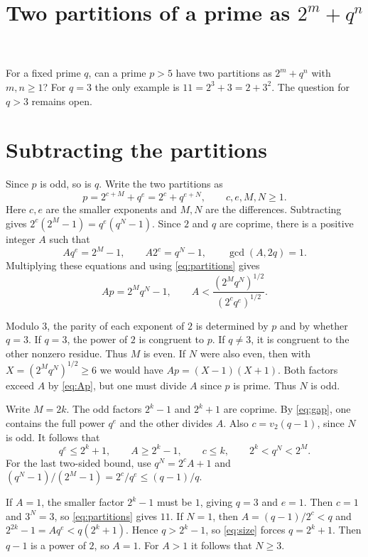 \documentclass[11pt]{article}
\title{Two partitions of a prime as \texorpdfstring{$2^m+q^n$}{2^m + q^n}}
\author{}
\date{}
\begin{document}
\maketitle

For a fixed prime $q$, can a prime $p>5$ have two partitions
as $2^m+q^n$ with $m,n\ge1$? For $q=3$ the only example is
$11=2^3+3=2+3^2$. The question for $q>3$ remains open.

\section{Subtracting the partitions}

Since $p$ is odd, so is $q$. Write the two partitions as
\begin{equation}\label{eq:partitions}
p=2^{c+M}+q^e=2^c+q^{e+N},
\qquad c,e,M,N\ge1.
\end{equation}
Here $c,e$ are the smaller exponents and $M,N$ are the differences.
Subtracting gives $2^c(2^M-1)=q^e(q^N-1)$. Since $2$ and $q$ are coprime,
there is a positive integer $A$ such that
\begin{equation}\label{eq:gap}
Aq^e=2^M-1,\qquad A2^c=q^N-1,\qquad \gcd(A,2q)=1.
\end{equation}
Multiplying these equations and using \eqref{eq:partitions} gives
\begin{equation}\label{eq:Ap}
Ap=2^M q^N-1,\qquad A<\frac{(2^M q^N)^{1/2}}{(2^c q^e)^{1/2}}.
\end{equation}

Modulo $3$, the parity of each exponent of $2$ is determined by $p$
and by whether $q=3$. If $q=3$, the power of $2$ is congruent to $p$.
If $q\ne3$, it is congruent to the other nonzero residue.
Thus $M$ is even. If $N$ were also even, then with
$X=(2^M q^N)^{1/2}\ge6$ we would have $Ap=(X-1)(X+1)$.
Both factors exceed $A$ by \eqref{eq:Ap}, but one must divide $A$
since $p$ is prime. Thus $N$ is odd.

Write $M=2k$. The odd factors $2^k-1$ and $2^k+1$ are coprime.
By \eqref{eq:gap}, one contains the full power $q^e$ and the other
divides $A$. Also $c=v_2(q-1)$, since $N$ is odd. It follows that
\begin{equation}\label{eq:size}
q^e\le2^k+1,\qquad A\ge2^k-1,\qquad
c\le k,\qquad 2^k<q^N<2^M.
\end{equation}
For the last two-sided bound, use $q^N=2^c A+1$ and
$(q^N-1)/(2^M-1)=2^c/q^e\le(q-1)/q$.

If $A=1$, the smaller factor $2^k-1$ must be $1$, giving $q=3$ and
$e=1$. Then $c=1$ and $3^N=3$, so \eqref{eq:partitions} gives $11$.
If $N=1$, then $A=(q-1)/2^c<q$ and
$2^{2k}-1=Aq^e<q(2^k+1)$. Hence $q>2^k-1$, so \eqref{eq:size}
forces $q=2^k+1$. Then $q-1$ is a power of $2$, so $A=1$.
For $A>1$ it follows that $N\ge3$.
\end{document}
